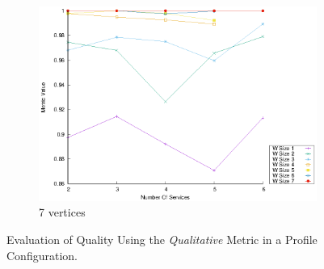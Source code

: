 \begin{figure}[!htb]
\begin{subfigure}{0.33\textwidth}
    \includegraphics[width=\textwidth]{Images/graphs/window_quality_performance_diff_qual_n7_s7_20_100_n7}
    \caption{7 vertices}
    \label{fig:quality_window_wide_qualitative_n7}
  \end{subfigure}

  \caption{Evaluation of Quality Using the \emph{Qualitative} Metric in a \wide Profile Configuration.}  \label{fig:quality_window_wide_qualitative}
\end{figure}

